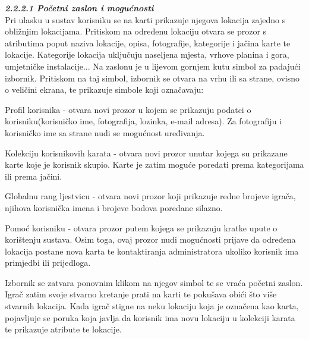 		\textbf{\textit{\small2.2.2.1 Početni zaslon i mogućnosti}}\\
		
		
		{Pri ulasku u sustav korisniku se na karti prikazuje njegova lokacija zajedno s obližnjim lokacijama. Pritiskom na određenu lokaciju otvara se prozor s atributima poput naziva lokacije, opisa, fotografije, kategorije i jačina karte te lokacije. Kategorije lokacija uključuju naseljena mjesta, vrhove planina i gora, umjetničke instalacije... Na zaslonu je u lijevom gornjem kutu simbol za padajući izbornik. Pritiskom na taj simbol, izbornik se otvara na vrhu ili sa strane, ovisno o veličini ekrana, te prikazuje simbole koji označavaju:  }
		
			\begin{packed_item}
			\item {Profil korisnika - otvara novi prozor u kojem se prikazuju podatci o korisniku(korisničko ime, fotografija, lozinka, e-mail adresa). Za fotografiju i korisničko ime sa strane nudi se mogućnost uređivanja.}\\
			\item {Kolekciju korisnikovih karata - otvara novi prozor unutar kojega su prikazane karte koje je korisnik skupio. Karte je zatim moguće poredati prema kategorijama ili prema jačini.}\\
			\item {Globalnu rang ljestvicu - otvara novi prozor koji prikazuje redne brojeve igrača, njihova korisnička imena i brojeve bodova poredane silazno.}\\
			\item {Pomoć korisniku - otvara prozor putem kojega se prikazuju kratke upute o korištenju sustava. Osim toga, ovaj prozor nudi mogućnosti prijave da određena lokacija postane nova karta te kontaktiranja administratora ukoliko korisnik ima primjedbi ili prijedloga. }
			\end{packed_item}
		
		{Izbornik se zatvara ponovnim klikom na njegov simbol te se vraća početni zaslon. Igrač zatim svoje stvarno kretanje prati na karti te pokušava obići što više stvarnih lokacija. Kada igrač stigne na neku lokaciju koja je označena kao karta, pojavljuje se poruka koja javlja da korisnik ima novu lokaciju u kolekciji karata te prikazuje atribute te lokacije.}\\ \\ \\
		
